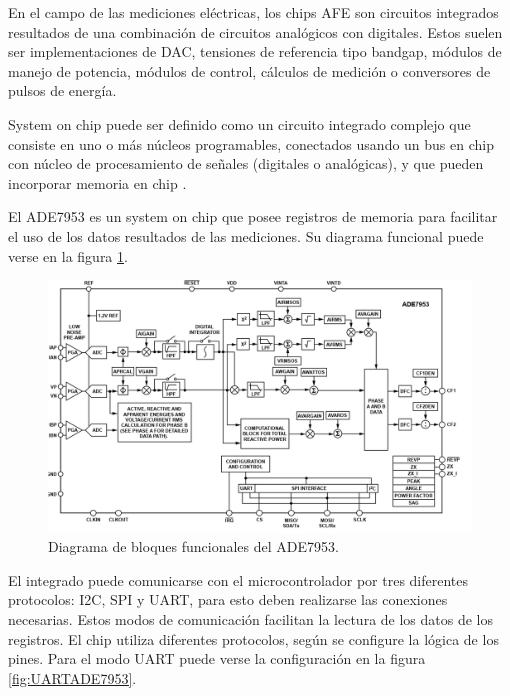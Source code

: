 En el campo de las mediciones eléctricas, los chips AFE son circuitos integrados resultados de una combinación de circuitos analógicos con digitales. Estos suelen ser implementaciones de DAC, tensiones de referencia tipo bandgap, módulos de manejo de potencia, módulos de control, cálculos de medición o conversores de pulsos de energía.


System on chip puede ser definido como un circuito integrado complejo que consiste en uno o más núcleos programables, conectados usando un bus en chip con núcleo de procesamiento de señales (digitales o analógicas), y que pueden incorporar memoria en chip \cite{badawy2002system}. 

El ADE7953 es un system on chip que posee registros de memoria para facilitar el uso de los datos resultados de las mediciones. Su diagrama funcional puede verse en la figura \ref{fig:ADEfuncbloc}.

\begin{figure}[h]
	\centering
	\includegraphics[width=\textwidth , keepaspectratio]{Figures/ade7953funcdiagr.png}
	\caption{Diagrama de bloques funcionales del ADE7953.}
	\label{fig:ADEfuncbloc}
\end{figure}


El integrado puede comunicarse con el microcontrolador por tres diferentes protocolos: I2C, SPI y UART, para esto deben realizarse las conexiones necesarias. Estos modos de comunicación facilitan la lectura de los datos de los registros. El chip utiliza diferentes protocolos, según se configure la lógica de los pines. Para el modo UART puede verse la configuración en la figura \ref{fig:UARTADE7953}.

